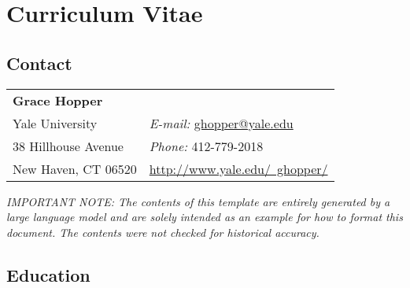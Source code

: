 \documentclass[11pt]{report}
\providecommand*\email[1]{\href{mailto:#1}{#1}}
\begin{document}
\begin{internalonly}
\tableofcontents
\end{internalonly}

\chapter{Curriculum Vitae}

\begin{externalonly}

\section{Contact}

%
%
\newlength{\rcollength}\setlength{\rcollength}{2.5in}%
%
\begin{tabular}[t]{@{}p{\linewidth-\rcollength}p{\rcollength}}
{\large \bf Grace Hopper} & \\
Yale University   & \textit{E-mail:} \email{ghopper@yale.edu}\\
38 Hillhouse Avenue  & \textit{Phone:} 412-779-2018 \\
New Haven, CT 06520    &       \href{http://www.yale.edu/~ghopper/}{http://www.yale.edu/~ghopper/}
\end{tabular}
\end{externalonly}

\textit{IMPORTANT NOTE: The contents of this template are entirely generated by a large language model and are solely intended as an example for how to format this document. The contents were not checked for historical accuracy.}

\section{Education}
\end{document}
